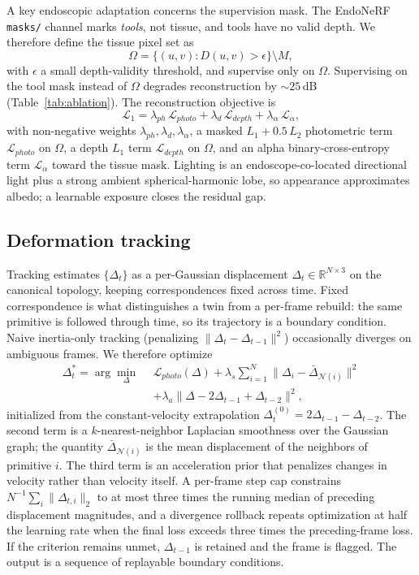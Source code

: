 \documentclass[smallextended]{svjour3}
\begin{document}
A key endoscopic adaptation concerns the supervision mask. The EndoNeRF
\texttt{masks/} channel marks \emph{tools}, not tissue, and tools have no
valid depth. We therefore define the tissue pixel set as
\begin{equation}
\Omega = \{(u,v) : D(u,v) > \epsilon \} \setminus M,
\label{eq:mask}
\end{equation}
with $\epsilon$ a small depth-validity threshold, and supervise only on
$\Omega$. Supervising on the tool mask instead of $\Omega$ degrades
reconstruction by ${\sim}25$\,dB (Table~\ref{tab:ablation}). The reconstruction
objective is
\begin{equation}
\mathcal{L}_1 = \lambda_{ph}\,\mathcal{L}_{photo} + \lambda_d\,\mathcal{L}_{depth} + \lambda_\alpha\,\mathcal{L}_{\alpha},
\label{eq:tier1loss}
\end{equation}
with non-negative weights $\lambda_{ph},\lambda_d,\lambda_\alpha$, a masked
$L_1 + 0.5\,L_2$ photometric term $\mathcal{L}_{photo}$ on $\Omega$, a
depth $L_1$ term $\mathcal{L}_{depth}$ on $\Omega$, and an alpha
binary-cross-entropy term
$\mathcal{L}_{\alpha}$ toward the tissue mask. Lighting is an
endoscope-co-located directional light plus a strong ambient
spherical-harmonic lobe, so appearance approximates albedo; a learnable
exposure closes the residual gap.

\subsection{Deformation tracking}
\label{sec:tier2}
Tracking estimates $\{\Delta_t\}$ as a per-Gaussian displacement
$\Delta_t \in \mathbb{R}^{N \times 3}$ on the canonical topology, keeping
correspondences fixed across time. Fixed correspondence is what
distinguishes a twin from a per-frame rebuild: the same primitive is
followed through time, so its trajectory is a boundary condition. Naive
inertia-only tracking (penalizing $\|\Delta_t - \Delta_{t-1}\|^2$)
occasionally diverges on ambiguous frames. We therefore optimize
\begin{align}
\Delta_t^* = \arg\min_{\Delta}\ \ & \mathcal{L}_{photo}(\Delta)
+ \lambda_s \sum_{i=1}^{N} \big\| \Delta_i - \bar{\Delta}_{\mathcal{N}(i)} \big\|^2 \nonumber\\
& + \lambda_a \big\| \Delta - 2\Delta_{t-1} + \Delta_{t-2} \big\|^2,
\label{eq:track}
\end{align}
initialized from the constant-velocity extrapolation
$\Delta_t^{(0)} = 2\Delta_{t-1} - \Delta_{t-2}$. The second term is a
$k$-nearest-neighbor Laplacian smoothness over the Gaussian graph; the
quantity $\bar{\Delta}_{\mathcal{N}(i)}$ is the mean displacement of the
neighbors of primitive $i$. The third term is an acceleration prior that
penalizes changes in velocity rather
than velocity itself. A per-frame step cap constrains
$N^{-1}\sum_i\|\Delta_{t,i}\|_2$ to at most three times the running median
of preceding displacement magnitudes, and
a divergence rollback repeats optimization at half the learning rate when
the final loss exceeds three times the preceding-frame loss. If the
criterion remains unmet, $\Delta_{t-1}$ is retained and the frame is
flagged. The output is a sequence of replayable boundary conditions.
\end{document}
